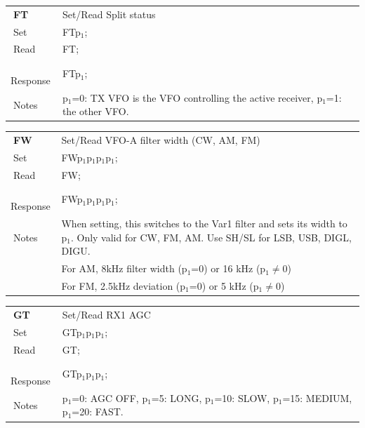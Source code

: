 \documentclass[12pt]{book}
\begin{document}
\begin{center}
\begin{tabular}{|p{2cm}|p{11cm}|}
\toprule
$\phantom{\Big|}$\textbf{\large FT} & Set/Read Split status \\\cline{1-2}
$\phantom{\Big|}${\large Set} & {FTp$_1$;} \\\hline
$\phantom{\Big|}${\large Read} & {FT;} \\\hline
$\phantom{\Big|}${\large Response} & {FTp$_1$;} \\\hline
$\phantom{\Big|}${\large Notes} & \multicolumn{1}{|p{11cm}|}{p$_1$=0: TX VFO is the VFO controlling the active receiver, p$_1$=1: the other VFO.} \\
\bottomrule
\end{tabular}
\end{center}

\begin{center}
\begin{tabular}{|p{2cm}|p{11cm}|}
\toprule
$\phantom{\Big|}$\textbf{\large FW} & Set/Read VFO-A filter width (CW, AM, FM) \\\cline{1-2}
$\phantom{\Big|}${\large Set} & {FWp$_1$p$_1$p$_1$p$_1$;} \\\hline
$\phantom{\Big|}${\large Read} & {FW;} \\\hline
$\phantom{\Big|}${\large Response} & {FWp$_1$p$_1$p$_1$p$_1$;} \\\hline
$\phantom{\Big|}${\large Notes} & \multicolumn{1}{|p{11cm}|}{When setting, this switches to the Var1 filter and sets its  width to p$_1$. Only valid for CW, FM, AM. Use SH/SL for LSB, USB, DIGL, DIGU.} \\
& \multicolumn{1}{|p{11cm}|}{For AM, 8kHz filter width (p$_1$=0) or  16 kHz (p$_1$$\ne$0)} \\
& \multicolumn{1}{|p{11cm}|}{For FM, 2.5kHz deviation (p$_1$=0) or 5 kHz (p$_1$$\ne$0)} \\
\bottomrule
\end{tabular}
\end{center}

\begin{center}
\begin{tabular}{|p{2cm}|p{11cm}|}
\toprule
$\phantom{\Big|}$\textbf{\large GT} & Set/Read RX1 AGC \\\cline{1-2}
$\phantom{\Big|}${\large Set} & {GTp$_1$p$_1$p$_1$;} \\\hline
$\phantom{\Big|}${\large Read} & {GT;} \\\hline
$\phantom{\Big|}${\large Response} & {GTp$_1$p$_1$p$_1$;} \\\hline
$\phantom{\Big|}${\large Notes} & \multicolumn{1}{|p{11cm}|}{p$_1$=0: AGC OFF, p$_1$=5: LONG, p$_1$=10: SLOW, p$_1$=15: MEDIUM, p$_1$=20: FAST.} \\
\bottomrule
\end{tabular}
\end{center}
\end{document}
